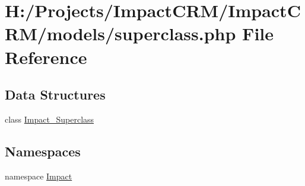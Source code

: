 \hypertarget{superclass_8php}{
\section{H:/Projects/ImpactCRM/ImpactCRM/models/superclass.php File Reference}
\label{superclass_8php}
}
\subsection*{Data Structures}
\begin{DoxyCompactItemize}
\item 
class \hyperlink{classImpact__Superclass}{Impact\_\-Superclass}
\end{DoxyCompactItemize}
\subsection*{Namespaces}
\begin{DoxyCompactItemize}
\item 
namespace \hyperlink{namespaceImpact}{Impact}
\end{DoxyCompactItemize}
